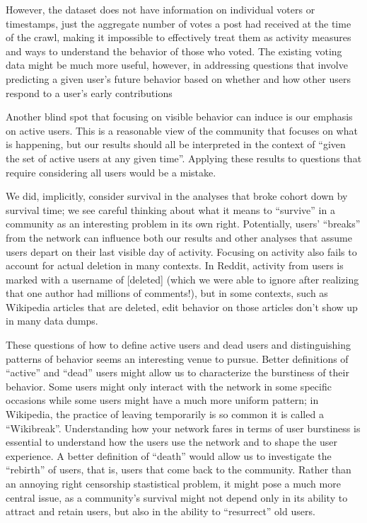 However, the dataset does not have information on individual voters or timestamps, just the aggregate number of votes a post had received at the time of the crawl, making it impossible to effectively treat them as activity measures and ways to understand the behavior of those who voted.  The existing voting data might be much more useful, however, in addressing questions that involve predicting a given user's future behavior based on whether and how other users respond to a user's early contributions \cite{joyce_kraut_2006, lampe_everything2, etc.}

Another blind spot that focusing on visible behavior can induce is our emphasis on active users.  This is a reasonable view of the community that focuses on what is happening, but our results should all be interpreted in the context of ``given the set of active users at any given time''.  Applying these results to questions that require considering all users would be a mistake.  

We did, implicitly, consider survival in the analyses that broke cohort down by survival time; we see careful thinking about what it means to ``survive'' in a community as an interesting problem in its own right.  Potentially, users' ``breaks'' from the network can influence both our results and other analyses that assume users depart on their last visible day of activity. 
Focusing on activity also fails to account for actual deletion in many contexts.  In Reddit, activity from users is marked with a username of [deleted] (which we were able to ignore after realizing that one author had millions of comments!), but in some contexts, such as Wikipedia articles that are deleted, edit behavior on those articles don't show up in many data dumps.

These questions of how to define active users and dead users and distinguishing patterns of behavior seems an interesting venue to pursue. Better definitions of ``active'' and ``dead'' users might allow us to characterize the burstiness of their behavior.  Some users might only interact with the network in some specific occasions while some users might have a much more uniform pattern; in Wikipedia, the practice of leaving temporarily is so common it is called a ``Wikibreak''. Understanding how your network fares in terms of user burstiness is essential to understand how the users use the network and to shape the user experience.  A better definition of ``death'' would allow us to investigate the ``rebirth'' of users, that is, users that come back to the community.  Rather than an annoying right censorship stastistical problem, it might pose a much more central issue, as a community's survival might not depend only in its ability to attract and retain users, but also in the ability to ``resurrect'' old users.

